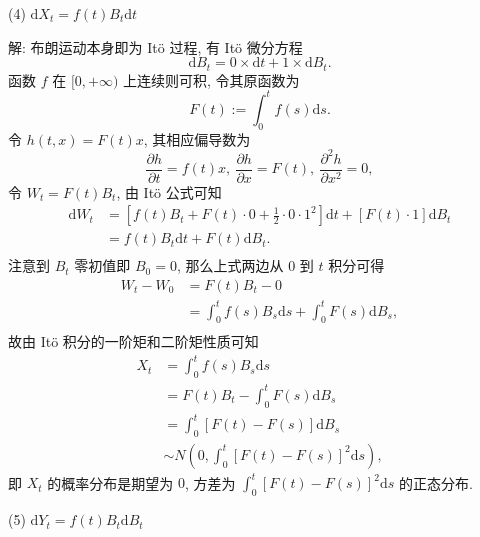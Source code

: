 \documentclass[openany]{ctexbook}
\theoremstyle{kaiti}
\theoremstyle{normal}
\begin{document}
(4) $\mathrm{d}X_t=f(t)B_t\mathrm{d}t$

解: 布朗运动本身即为 It\"o 过程, 有 It\"o 微分方程
\begin{equation}
  \mathrm{d}B_t=0\times\mathrm{d}t+1\times\mathrm{d}B_t.
\end{equation}
函数 $f$ 在 $[0,+\infty)$ 上连续则可积, 令其原函数为
\begin{equation}
  F(t):=\int_0^tf(s)\mathrm{d}s.
\end{equation}
令 $h(t,x)=F(t)x$, 其相应偏导数为
\begin{equation}
  \frac{\partial h}{\partial t}=f(t)x,~
  \frac{\partial h}{\partial x}=F(t),~
  \frac{\partial^2 h}{\partial x^2}=0,
\end{equation}
令 $W_t=F(t)B_t$, 由 It\"o 公式可知
\begin{equation}
  \begin{aligned}
    \mathrm{d}W_t
    &=\left[f(t)B_t+F(t)\cdot0+\frac{1}{2}\cdot0\cdot1^2\right]\mathrm{d}t+[F(t)\cdot1]\mathrm{d}B_t\\
    &=f(t)B_t\mathrm{d}t+F(t)\mathrm{d}B_t.\\
  \end{aligned}
\end{equation}
注意到 $B_t$ 零初值即 $B_0=0$, 那么上式两边从 $0$ 到 $t$ 积分可得
\begin{equation}
  \begin{aligned}
    W_t-W_0
    &=F(t)B_t-0\\
    &=\int_0^tf(s)B_s\mathrm{d}s+\int_0^tF(s)\mathrm{d}B_s,\\
  \end{aligned}
\end{equation}
故由 It\"o 积分的一阶矩和二阶矩性质可知
\begin{equation}
  \begin{aligned}
  X_t
  &=\int_0^tf(s)B_s\mathrm{d}s\\
  &=F(t)B_t-\int_0^tF(s)\mathrm{d}B_s\\
  &=\int_0^t[F(t)-F(s)]\mathrm{d}B_s\\
  &\sim N\left(0,\int_0^t[F(t)-F(s)]^2\mathrm{d}s\right),
  \end{aligned}
\end{equation}
即 $X_t$ 的概率分布是期望为 $0$, 方差为 $\displaystyle\int_0^t[F(t)-F(s)]^2\mathrm{d}s$ 的正态分布.

(5) $\mathrm{d}Y_t=f(t)B_t\mathrm{d}B_t$
\end{document}
